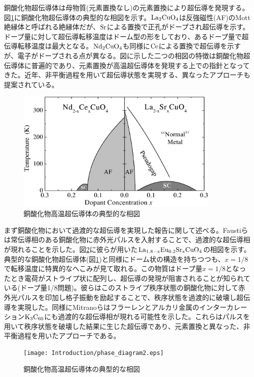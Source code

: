 銅酸化物超伝導体は母物質(元素置換なし)の元素置換により超伝導を発現する\cite{Lee2006}。図\ref{fig:phase_diagram}に銅酸化物超伝導体の典型的な相図を示す\cite{Andrea2003}。$\rm La_2CuO_4$は反強磁性(AF)のMott絶縁体と呼ばれる絶縁体だが、$\rm Sr$による置換で正孔がドープされ超伝導を示す。ドープ量に対して超伝導転移温度はドーム型の形をしており、あるドープ量で超伝導転移温度は最大となる。$\rm Nd_2CuO_4$も同様に$\rm Ce$による置換で超伝導を示すが、電子がドープされる点が異なる。図に示した二つの相図の特徴は銅酸化物超伝導体に普遍的であり\cite{Lee2006}、元素置換が高温超伝導体を発現する上での指針となってきた。近年、非平衡過程を用いて超伝導状態を実現する、異なったアプローチも提案されている。
\begin{figure}[htb]
    \begin{center}
   \includegraphics[width=100mm]{Introduction/phase_diagram.eps}
  \end{center}
  \caption{銅酸化物高温超伝導体の典型的な相図\cite{Andrea2003}}
  \label{fig:phase_diagram}
\end{figure}

まず銅酸化物において過渡的な超伝導を実現した報告に関して述べる。Faustiらは常伝導相のある銅酸化物に赤外光パルスを入射することで、過渡的な超伝導相が現れることを示した\cite{Fausti,Hunt2015}。図\ref{fig:phase_diagram2}に彼らが用いた$\rm La_{1.8-x}Eu_{0.2}Sr_{x}CuO_4$の相図を示す\cite{Cavalleri2018}。典型的な銅酸化物超伝導体(図\ref{fig:phase_diagram})と同様にドーム状の構造を持ちつつも、$x=1/8$で転移温度に特異的なへこみが見て取れる。この物質はドープ量$x=1/8$となったとき電荷がストライプ状に配列し、超伝導の発現が阻害されることが知られている(ドープ量1/8問題)。彼らはこのストライプ秩序状態の銅酸化物に対して赤外光パルスを印加し格子振動を励起することで、秩序状態を過渡的に破壊し超伝導を実現した。同様にMitranoらはフラーレンとアルカリ金属のインターカレーション$\rm K_3C_{60}$にも過渡的な超伝導相が現れる可能性を示した\cite{Mitrano2016}。これらはパルスを用いて秩序状態を破壊した結果に生じた超伝導であり、元素置換と異なった、非平衡過程を用いたアプローチである。
\begin{figure}[htb]
    \begin{center}
   \texttt{[image: Introduction/phase\_diagram2.eps]}
  \end{center}
  \caption{銅酸化物高温超伝導体の典型的な相図\cite{Cavalleri2018}}
  \label{fig:phase_diagram2}
\end{figure}

